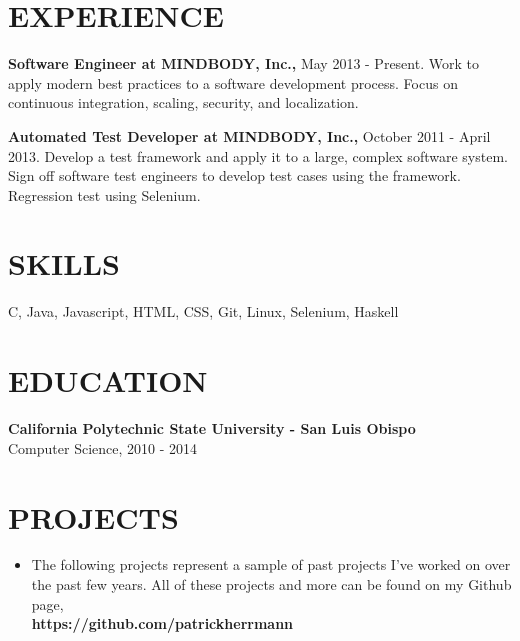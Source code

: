 \documentclass{res}
\begin{document}
\thispagestyle{empty} %
\address{1880 Slater Street\\
Santa Rosa, CA 95404\\
(707) 548 - 9187}

\begin{resume}
 
\section{EXPERIENCE}
\vspace{0.1in}
    {\bf Software Engineer at MINDBODY, Inc.,} May 2013 - Present.
    Work to apply modern best practices to a software development process.
    Focus on continuous integration, scaling, security, and localization.

 
    {\bf Automated Test Developer at MINDBODY, Inc.,} October 2011 - April 2013.
    Develop a test framework and apply it to a large, complex software
    system. Sign off software test engineers to develop test cases using the framework. Regression test using Selenium.

\section{SKILLS}
\vspace{0.1in}
    C, Java, Javascript, HTML, CSS, Git, Linux, Selenium, Haskell
    
\section{EDUCATION}
\vspace{0.1in}
 
    {\bf California Polytechnic State University - San Luis Obispo} \\
    Computer Science, 2010 - 2014
    
    
\section{PROJECTS}
\vspace{0.2in}
   \begin{itemize} %
      \item[] The following projects represent a sample of past projects I've worked
      on over the past few years. All of these projects and more can be found on my
       Github page, \\
      {\bf https://github.com/patrickherrmann}
      \end{itemize}


\end{resume}
\end{document}
